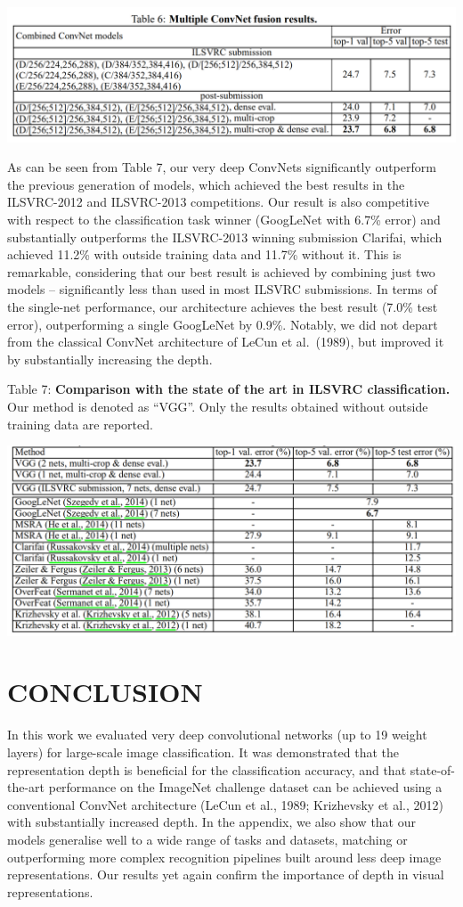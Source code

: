 \documentclass[12pt,a4paper,UTF8,twoside]{book}
\begin{document}
\begin{center}\includegraphics[width=0.7\linewidth]{img/03-06} \end{center}

As can be seen from Table 7, our very deep ConvNets significantly outperform the previous generation of models, which achieved the best results in the ILSVRC-2012 and ILSVRC-2013 competitions. Our result is also competitive with respect to the classification task winner (GoogLeNet with 6.7\% error) and substantially outperforms the ILSVRC-2013 winning submission Clarifai, which achieved 11.2\% with outside training data and 11.7\% without it. This is remarkable, considering that our best result is achieved by combining just two models -- significantly less than used in most ILSVRC submissions. In terms of the single-net performance, our architecture achieves the best result (7.0\% test error), outperforming a single GoogLeNet by 0.9\%. Notably, we did not depart from the classical ConvNet architecture of LeCun et al.~(1989), but improved it by substantially increasing the depth.

Table 7: \textbf{Comparison with the state of the art in ILSVRC classification.} Our method is denoted as ``VGG''. Only the results obtained without outside training data are reported.

\begin{center}\includegraphics[width=0.7\linewidth]{img/03-07} \end{center}

\hypertarget{conclusion}{%
\section{CONCLUSION}\label{conclusion}}

In this work we evaluated very deep convolutional networks (up to 19 weight layers) for large-scale image classification. It was demonstrated that the representation depth is beneficial for the classification accuracy, and that state-of-the-art performance on the ImageNet challenge dataset can be achieved using a conventional ConvNet architecture (LeCun et al., 1989; Krizhevsky et al., 2012) with substantially increased depth. In the appendix, we also show that our models generalise well to a wide range of tasks and datasets, matching or outperforming more complex recognition pipelines built around less deep image representations. Our results yet again confirm the importance of depth in visual representations.
\end{document}
